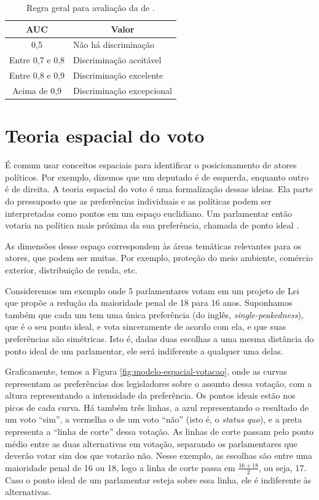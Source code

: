 \documentclass[a4paper,titlepage]{ppgi}\usepackage[]{graphicx}\usepackage[]{color}
\begin{document}
\begin{table}
\caption{Regra geral para avaliação da  de .}
\label{table:valores-auc}
\centering
\begin{tabular}{c l}
  \acrshort{AUC} & \multicolumn{1}{c}{Valor} \\
  \hline
  0,5 & Não há discriminação \\
  Entre 0,7 e 0,8 & Discriminação aceitável \\
  Entre 0,8 e 0,9 & Discriminação excelente \\
  Acima de 0,9 & Discriminação excepcional \\
\end{tabular}
\end{table}

\section{Teoria espacial do voto}
\label{cap:fundamentacao:teoria-espacial-do-voto}



É comum usar conceitos espaciais para identificar o posicionamento de
atores políticos. Por exemplo, dizemos que um deputado é de esquerda, enquanto
outro é de direita. A teoria espacial do voto é uma formalização dessas ideias.
Ela parte do pressuposto que as preferências individuais e as políticas podem
ser interpretadas como pontos em um espaço euclidiano. Um parlamentar então
votaria na política mais próxima da sua preferência, chamada de ponto ideal
\cite{Leoni2002}.

As dimensões desse espaço correspondem às áreas temáticas relevantes para os
atores, que podem ser muitas. Por exemplo, proteção do meio ambiente, comércio
exterior, distribuição de renda, etc.

Consideremos um exemplo onde 5 parlamentares votam em
um projeto de Lei que propõe a redução da maioridade penal de
18 para 16 anos.
Suponhamos também que cada um tem uma única preferência (do inglês,
\emph{single-peakedness}), que é o seu ponto ideal, e vota sinceramente de
acordo com ela, e que suas preferências são simétricas. Isto é, dadas duas
escolhas a uma mesma distância do ponto ideal de um parlamentar, ele será
indiferente a qualquer uma delas.

Graficamente, temos a Figura \ref{fig:modelo-espacial-votacao}, onde as curvas
representam as preferências dos legisladores sobre o assunto dessa votação, com
a altura representando a intensidade da preferência. Os pontos ideais estão nos
picos de cada curva. Há também três linhas, a azul representando o resultado de
um voto ``sim'', a vermelha o de um voto ``não'' (isto é, o \emph{status quo}),
e a preta representa a ``linha de corte'' dessa votação. As linhas de corte
passam pelo ponto médio entre as duas alternativas em votação, separando os
parlamentares que deverão votar sim dos que votarão não. Nesse exemplo, as
escolhas são entre uma maioridade penal de 16 ou
18, logo a linha de corte passa em $\frac{16 +
18}{2}$, ou seja, $17$. Caso o ponto ideal de um parlamentar esteja sobre essa
linha, ele é indiferente às alternativas.
\end{document}
